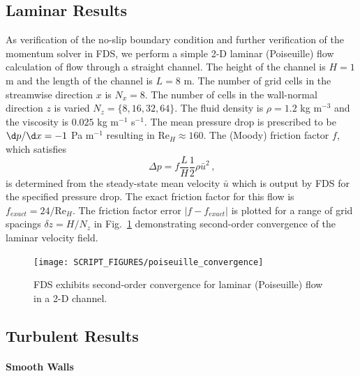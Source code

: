 \documentclass[11pt]{book}
\begin{document}
\subsection{Laminar Results}
\label{laminar}

As verification of the no-slip boundary condition and further verification of the momentum solver in FDS, we perform a simple 2-D laminar (Poiseuille) flow calculation of
flow through a straight channel.
The height of the channel is $H=1$ m and the length of the channel is $L=8$ m.
The number of grid cells in the streamwise direction $x$ is $N_x = 8$.  The number of cells in the wall-normal direction $z$ is varied $N_z = \{8,16,32,64\}$.
The fluid density is $\rho = 1.2$ kg m$^{-3}$ and the viscosity is $0.025$ kg m$^{-1}$ s$^{-1}$.
The mean pressure drop is prescribed to be $\d p/ \d x = -1$ Pa m$^{-1}$ resulting in Re$_H \approx 160$.  The (Moody) friction factor $f$, which satisfies
\begin{equation}
\label{eqn_moodyf}
\Delta p = f \frac{L}{H} \frac{1}{2} \rho \bar{u}^2 \,\mbox{,}
\end{equation}
is determined from the steady-state mean velocity $\bar{u}$ which is output by FDS for the specified pressure drop.  The exact friction factor for this flow is $f_{exact} = 24/\mbox{Re}_H$.  The friction factor error $|f-f_{exact}|$ is plotted for a range of grid spacings $\delta z = H/N_z$ in Fig.~\ref{fig_poiseuille_convergence} demonstrating second-order convergence of the laminar velocity field.
\begin{figure}
\centering
\texttt{[image: SCRIPT\_FIGURES/poiseuille\_convergence]}
\caption[Convergence for laminar (Poiseuille) flow in a 2-D channel]{FDS exhibits second-order convergence for laminar (Poiseuille) flow in a 2-D channel.}
\label{fig_poiseuille_convergence}
\end{figure}

\subsection{Turbulent Results}
\label{turbulent}

\paragraph{Smooth Walls}
\end{document}
